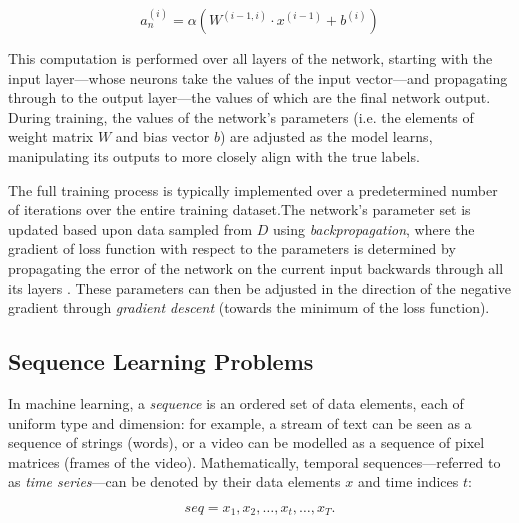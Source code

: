 \documentclass[a4paper, 11pt]{report}
\begin{document}
    \begin{equation}
        \label{eq: activation-value}
        a^{(i)}_n = \alpha( W^{(i-1, i)} \cdot x^{(i-1)} + b^{(i)} )
    \end{equation}

    This computation is performed over all layers of the network, starting with the input layer---whose neurons take the values of the input vector---and propagating through to the output layer—the values of which are the final network output. During training, the values of the network's parameters (i.e. the elements of weight matrix $W$ and bias vector $b$) are adjusted as the model learns, manipulating its outputs to more closely align with the true labels. 
    
    The full training process is typically implemented over a predetermined number of iterations over the entire training dataset.The network's parameter set is updated based upon data sampled from $D$ using \emph{backpropagation}, where the gradient of loss function with respect to the parameters is determined by propagating the error of the network on the current input backwards through all its layers \citep{zaras-2022}. These parameters can then be adjusted in the direction of the negative gradient through \emph{gradient descent} (towards the minimum of the loss function).


    \subsection{Sequence Learning Problems}

    In machine learning, a \emph{sequence} is an ordered set of data elements, each of uniform type and dimension: for example, a stream of text can be seen as a sequence of strings (words), or a video can be modelled as a sequence of pixel matrices (frames of the video). Mathematically, temporal sequences---referred to as \emph{time series}---can be denoted by their data elements $x$ and time indices $t$:

    \begin{equation}
        \label{eq: timeseries}
        seq = x_1, x_2, \ldots, x_t, \ldots, x_T
        \text{.}
    \end{equation}
\end{document}
